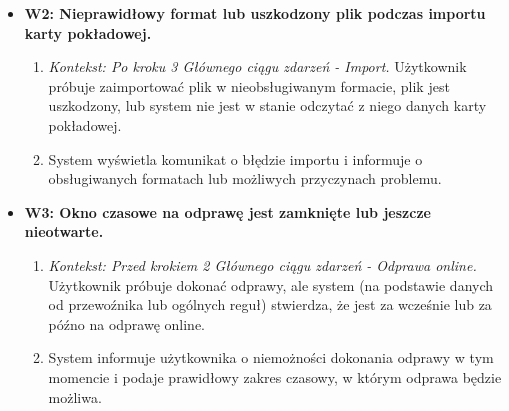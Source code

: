 \documentclass[a4paper,12pt]{article}
\begin{document}
\begin{itemize}
\begin{itemize}
\begin{enumerate}
                \end{enumerate}
            \item \textbf{W2: Nieprawidłowy format lub uszkodzony plik podczas importu karty pokładowej.}
                \begin{enumerate}
                    \item \textit{Kontekst: Po kroku 3 Głównego ciągu zdarzeń - Import.} Użytkownik próbuje zaimportować plik w nieobsługiwanym formacie, plik jest uszkodzony, lub system nie jest w stanie odczytać z niego danych karty pokładowej.
                    \item System wyświetla komunikat o błędzie importu i informuje o obsługiwanych formatach lub możliwych przyczynach problemu.
                \end{enumerate}
            \item \textbf{W3: Okno czasowe na odprawę jest zamknięte lub jeszcze nieotwarte.}
                \begin{enumerate}
                    \item \textit{Kontekst: Przed krokiem 2 Głównego ciągu zdarzeń - Odprawa online.} Użytkownik próbuje dokonać odprawy, ale system (na podstawie danych od przewoźnika lub ogólnych reguł) stwierdza, że jest za wcześnie lub za późno na odprawę online.
                    \item System informuje użytkownika o niemożności dokonania odprawy w tym momencie i podaje prawidłowy zakres czasowy, w którym odprawa będzie możliwa.
                \end{enumerate}
        \end{itemize}
\end{itemize}
\end{document}
